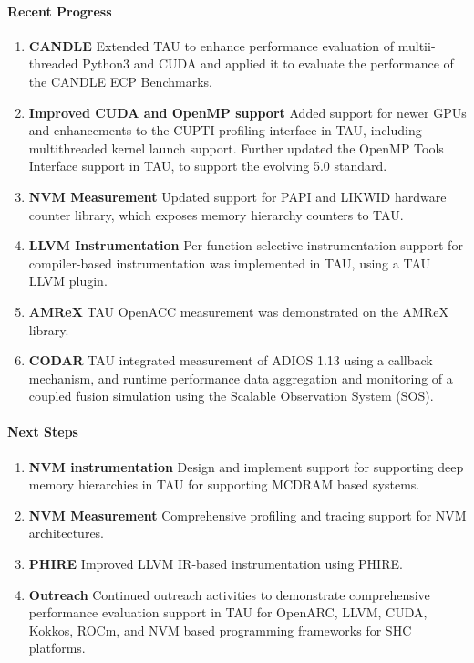 \paragraph{Recent Progress}
\begin{enumerate}
\item \textbf{CANDLE} Extended TAU to enhance performance evaluation of multii-threaded Python3 and CUDA and applied it to evaluate the performance of the CANDLE ECP Benchmarks.

\item \textbf{Improved CUDA and OpenMP support} Added support for newer GPUs and enhancements to the CUPTI profiling interface in TAU, including multithreaded kernel launch support.  Further updated the OpenMP Tools Interface support in TAU, to support the evolving 5.0 standard. 

\item \textbf{NVM Measurement} Updated support for PAPI and LIKWID hardware counter library, which exposes memory hierarchy counters to TAU.

\item \textbf{LLVM Instrumentation} Per-function selective instrumentation support for compiler-based instrumentation was implemented in TAU, using a TAU LLVM plugin.

\item \textbf{AMReX} TAU OpenACC measurement was demonstrated on the AMReX library.

\item \textbf{CODAR} TAU integrated measurement of ADIOS 1.13 using a callback mechanism, and runtime performance data aggregation and monitoring of a coupled fusion simulation using the Scalable Observation System (SOS).
\end{enumerate}

\paragraph{Next Steps}
\begin{enumerate}
\item \textbf{NVM instrumentation} 
Design and implement support for supporting deep memory hierarchies in TAU for supporting MCDRAM based systems. 

\item \textbf{NVM Measurement} 
Comprehensive profiling and tracing support for NVM architectures.

\item \textbf{PHIRE} 
Improved LLVM IR-based instrumentation using PHIRE.

\item \textbf{Outreach}
Continued outreach activities to demonstrate comprehensive performance evaluation support in TAU for OpenARC, LLVM, CUDA, Kokkos, ROCm, and NVM based programming frameworks for SHC platforms. 
\end{enumerate}
